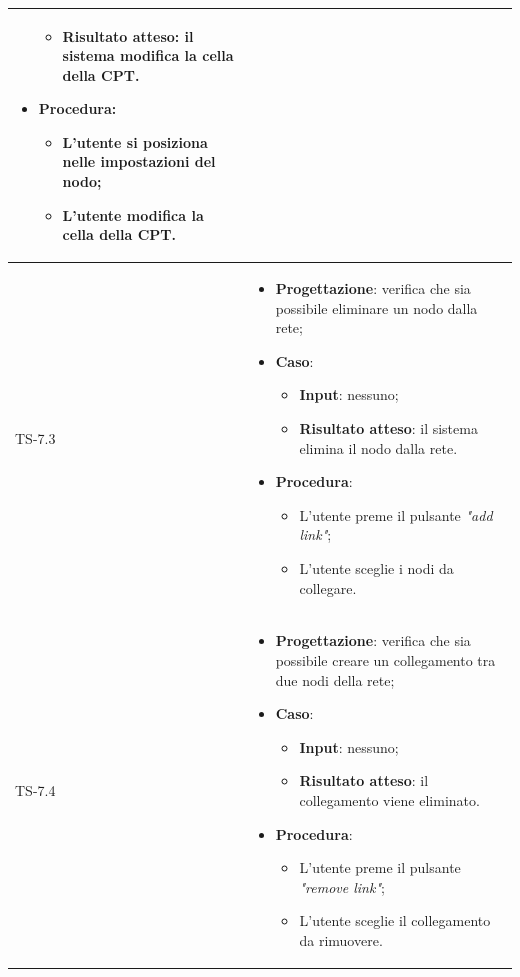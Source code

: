 \begin{longtable}{|C{2.5cm}|C{13cm}|}
\begin{itemize}
\begin{itemize}
		\item \textbf{Risultato atteso}: il sistema modifica la cella della CPT.
	\end{itemize}
	\item \textbf{Procedura}:
	\begin{itemize}
		\item L'utente si posiziona nelle impostazioni del nodo;
		\item L'utente modifica la cella della CPT.
	\end{itemize} 
\end{itemize}
	 \\
	\hline
	{TS-7.3} &
\begin{itemize}
	\item \textbf{Progettazione}: verifica che sia possibile eliminare un
	nodo dalla rete;
	\item \textbf{Caso}: 
	\begin{itemize}
		\item \textbf{Input}: nessuno;
		\item \textbf{Risultato atteso}: il sistema elimina il nodo dalla rete.
	\end{itemize}
	\item \textbf{Procedura}:
	\begin{itemize}
		\item L'utente preme il pulsante \emph{"add link"};
		\item L'utente sceglie i nodi da collegare.
	\end{itemize} 
\end{itemize}
	  \\
	\hline
	{TS-7.4} & 
\begin{itemize}
	\item \textbf{Progettazione}: verifica che sia possibile creare un
	collegamento tra due nodi della rete;
	\item \textbf{Caso}: 
	\begin{itemize}
		\item \textbf{Input}: nessuno;
		\item \textbf{Risultato atteso}: il collegamento viene eliminato.
	\end{itemize}
	\item \textbf{Procedura}:
	\begin{itemize}
		\item L'utente preme il pulsante \emph{"remove link"};
		\item L'utente sceglie il collegamento da rimuovere.
	\end{itemize} 

\end{itemize}
\end{longtable}
